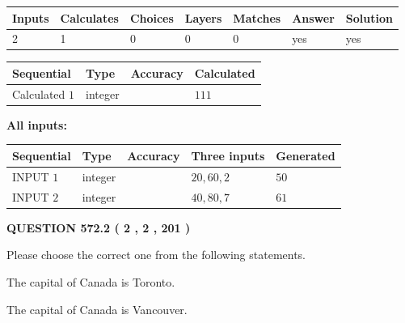 \documentclass[12pt]{article}
\begin{document}
   
   
   
\noindent\begin{tabular}{|l|l|l|l|l|l|l|}
 \hline
Inputs & Calculates & Choices & Layers & Matches & Answer & Solution \\ \hline
 2  & 
 1  & 
 0
  & 
 0  & 
 0  & 
  yes & 
  yes 
  \\ \hline
 \end{tabular}
   
   
   
   
\noindent{}
   
   
  
  
\noindent\begin{tabular}{|l|l|l|l|}
\hline
 Sequential & Type & Accuracy & Calculated \\ 
\hline
 
 
  Calculated $  1 $ & integer &  & 
  $ 111 $ 
 \\  \hline  
 \end{tabular}
   
   
   
   
\noindent\vspace{0.1in}\hspace{-0.08in} {\textbf{\Large{All inputs: }}}
   
   
  
  
\noindent\begin{tabular}{|l|l|l|l|l|}
\hline
 Sequential & Type & Accuracy & Three inputs & Generated \\ 
\hline
 
 
  INPUT $  1 $ & integer &  & $
 20
 , 
 60
 , 
 2
 $ & $ 50 $ 
 \\  \hline  
 
 
  INPUT $  2 $ & integer &  & $
 40
 , 
 80
 , 
 7
 $ & $ 61 $ 
 \\  \hline  
 \end{tabular}
   
   
  
\vspace{0.2in}
  
{\textbf{\Large{QUESTION
572.2 
 ( 2 , 2 , 201 )
}}}
  
  
Please choose the correct one from the following statements.
 
 
The capital of Canada is Toronto.
 
 
The capital of Canada is Vancouver.
 
\end{document}

